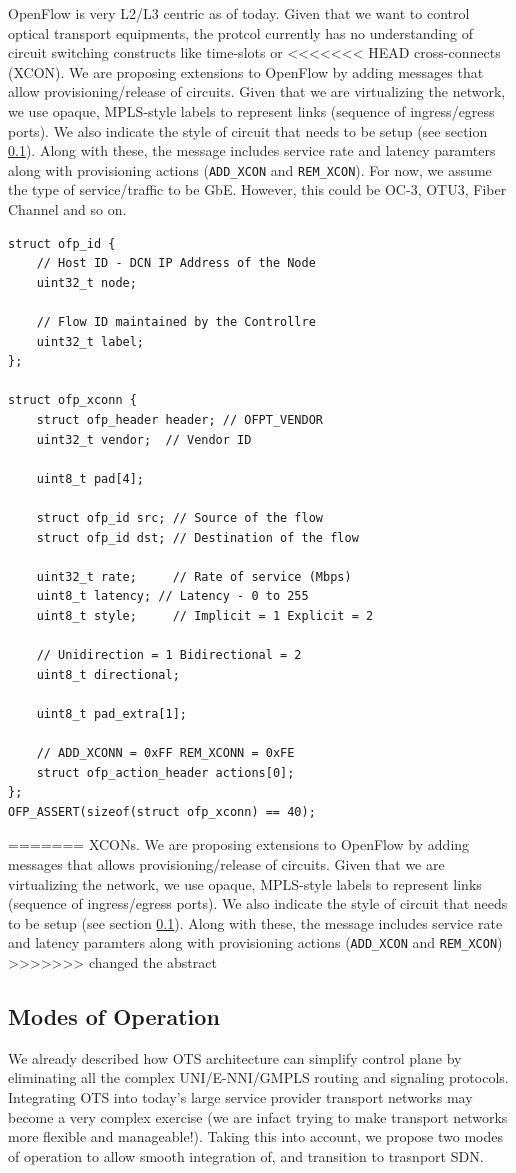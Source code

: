 \documentclass{sig-alternate-10pt}
\begin{document}
	OpenFlow \cite{OF1.0} is very L2/L3 centric as of today. Given that we want to control optical transport
	equipments, the protcol currently has no understanding of circuit switching constructs like time-slots or
<<<<<<< HEAD
	cross-connects (XCON). We are proposing extensions to OpenFlow by adding messages that allow provisioning/release of
	circuits. Given that we are virtualizing the network, we use opaque, MPLS-style labels to represent links
	(sequence of ingress/egress ports). We also indicate the style of circuit that needs to be setup (see
	section \ref{sec:modes}). Along with these, the message includes service rate and latency paramters along
	with provisioning actions (\texttt{ADD\_XCON} and \texttt{REM\_XCON}). For now, we assume the type of service/traffic 
	to be GbE. However, this could be OC-3, OTU3, Fiber Channel and so on.

	\begin{lstlisting}
struct ofp_id {
	// Host ID - DCN IP Address of the Node
	uint32_t node;

	// Flow ID maintained by the Controllre
	uint32_t label;
};

struct ofp_xconn {
	struct ofp_header header; // OFPT_VENDOR
	uint32_t vendor;  // Vendor ID

	uint8_t pad[4];
		  
	struct ofp_id src; // Source of the flow
	struct ofp_id dst; // Destination of the flow
		   
	uint32_t rate;     // Rate of service (Mbps)
	uint8_t latency; // Latency - 0 to 255
	uint8_t style;     // Implicit = 1 Explicit = 2

	// Unidirection = 1 Bidirectional = 2
	uint8_t directional;

	uint8_t pad_extra[1];

	// ADD_XCONN = 0xFF REM_XCONN = 0xFE
	struct ofp_action_header actions[0];
};
OFP_ASSERT(sizeof(struct ofp_xconn) == 40);
	\end{lstlisting}
=======
	XCONs. We are proposing extensions to OpenFlow by adding messages that allows provisioning/release of
	circuits. Given that we are virtualizing the network, we use opaque, MPLS-style labels to represent links
	(sequence of ingress/egress ports). We also indicate the style of circuit that needs to be setup (see
	section \ref{sec:modes}). Along with these, the message includes service rate and latency paramters along
	with provisioning actions (\texttt{ADD\_XCON} and \texttt{REM\_XCON})
>>>>>>> changed the abstract
	
	\subsection{Modes of Operation} \label{sec:modes}
	We already described how OTS architecture can simplify control plane by eliminating all the complex
	UNI/E-NNI/GMPLS routing and signaling protocols. Integrating OTS into today's large service provider transport
	networks may become a very complex exercise (we are infact trying to make transport networks more
	flexible and manageable!). Taking this into account, we propose two modes of operation to allow smooth
	integration of, and transition to trasnport SDN.
\end{document}
